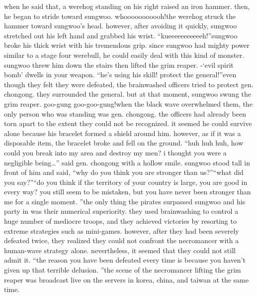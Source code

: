when he said that, a werehog standing on his right raised an iron hammer.
then, he began to stride toward sungwoo.
whooooooooooh!the werehog struck the hammer toward sungwoo’s head.
 however, after avoiding it quickly, sungwoo stretched out his left hand and grabbed his wrist.
“kueeeeeeeeeeeh!”sungwoo broke his thick wrist with his tremendous grip.
 since sungwoo had mighty power similar to a stage four werebull, he could easily deal with this kind of monster.
sungwoo threw him down the stairs then lifted the grim reaper.
-‘evil spirit bomb’ dwells in your weapon.
“he’s using his skill! protect the general!”even though they felt they were defeated, the brainwashed officers tried to protect gen.
 chongong.
 they surrounded the general.
but at that moment, sungwoo swung the grim reaper.
goo-gung goo-goo-gung!when the black wave overwhelmed them, the only person who was standing was gen.
 chongong.
 the officers had already been torn apart to the extent they could not be recognized.
it seemed he could survive alone because his bracelet formed a shield around him.
 however, as if it was a disposable item, the bracelet broke and fell on the ground.
“huh huh huh, how could you break into my area and destroy my men? i thought you were a negligible being…” said gen.
 chongong with a hollow smile.
sungwoo stood tall in front of him and said, “why do you think you are stronger than us?”“what did you say?”“do you think if the territory of your country is large, you are good in every way? you still seem to be mistaken, but you have never been stronger than me for a single moment.
”the only thing the pirates surpassed sungwoo and his party in was their numerical superiority.
 they used brainwashing to control a huge number of mediocre troops, and they achieved victories by resorting to extreme strategies such as mini-games.
however, after they had been severely defeated twice, they realized they could not confront the necromancer with a human-wave strategy alone.
 nevertheless, it seemed that they could not still admit it.
“the reason you have been defeated every time is because you haven’t given up that terrible delusion.
”the scene of the necromancer lifting the grim reaper was broadcast live on the servers in korea, china, and taiwan at the same time.


 